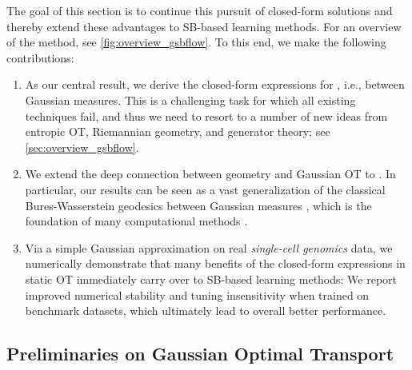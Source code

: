 The goal of this section is to continue this pursuit of closed-form solutions and thereby extend these advantages to \acrshort{SB}-based learning methods. For an overview of the method, see \cref{fig:overview_gsbflow}. To this end, we make the following contributions: \vspace{8pt}
\begin{enumerate}[leftmargin=.4cm,itemsep=.0cm,topsep=.0cm]
\item As our central result, we derive the closed-form expressions for , i.e.,  between Gaussian measures. This is a challenging task for which all existing techniques fail, and thus we need to resort to a number of new ideas from entropic \acrshort{OT}, Riemannian geometry, and generator theory; see \cref{sec:overview_gsbflow}.

\item We extend the deep connection between geometry and Gaussian \acrshort{OT} to . In particular, our results can be seen as a vast generalization of the classical Bures-Wasserstein geodesics between Gaussian measures \citep{takatsu2010wasserstein, bhatia2019bures}, which is the foundation of many computational methods \citep{chewi2020gradient, altschuler2021averaging, han2021riemannian}.

\item Via a simple Gaussian approximation on real \emph{single-cell genomics} data, we numerically demonstrate that many benefits of the closed-form expressions in static \acrshort{OT} immediately carry over to \acrshort{SB}-based learning methods: We report improved numerical stability and tuning insensitivity when trained on benchmark datasets, which ultimately lead to overall better performance.
\end{enumerate}

\subsection{Preliminaries on Gaussian Optimal Transport}
\label{sec:prelim_gsbflow}

